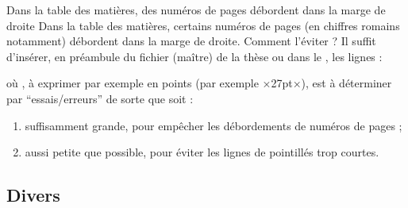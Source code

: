 \begin{dbfaq}{Dans la table des matières, des numéros de pages débordent dans
    la marge de droite}{}
  Dans la table des matières, certains numéros de pages (en chiffres romains
  notamment) débordent dans la marge de droite. Comment l'éviter ?
  \tcblower
  Il suffit d'insérer, en préambule du fichier (maître) de la thèse ou dans le
  \File{\configurationfile}, les lignes :
\begin{preamblecode}
\makeatletter
\renewcommand*\@pnumwidth{÷\meta{distance}÷}
\makeatother
\end{preamblecode}
  où , à exprimer par exemple en points (par exemple ×27pt×),
  est à déterminer par \enquote{essais/erreurs} de sorte que 
  soit :
  \begin{enumerate}
  \item suffisamment grande, pour empêcher les débordements de numéros de
    pages ;
  \item aussi petite que possible, pour éviter les lignes de pointillés trop
    courtes.
  \end{enumerate}
\end{dbfaq}

\subsection{Divers}
\label{sec:divers}

